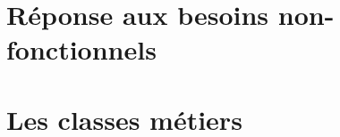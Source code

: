 \section{Réponse aux besoins non-fonctionnels}


\section{Les classes métiers}
\label{section_metiers}
